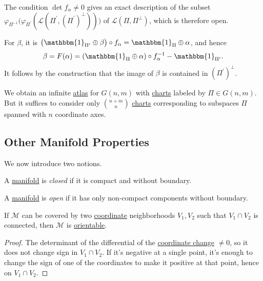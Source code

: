 \begin{note}
	The condition \(\det f_\alpha \neq 0\) gives an exact description of the subset \(\varphi _{\Pi ^{-1} }\big(\varphi _{\Pi ^\prime }(\mathcal{L} (\Pi ^\prime , (\Pi ^\prime )^{\perp} ))\big)\) of \(\mathcal{L} (\Pi , \Pi ^{\perp} )\), which is therefore open.
\end{note}

For \(\beta \), it is \(\big(\mathbbm{1}_{\Pi ^\prime }\oplus \beta \big) \circ f_\alpha = \mathbbm{1}_{\Pi }\oplus \alpha \), and hence
\[
	\beta = F(\alpha ) = (\mathbbm{1}_{\Pi }\oplus \alpha )\circ f_\alpha ^{-1} - \mathbbm{1}_{\Pi ^\prime } .
\]
It follows by the construction that the image of \(\beta \) is contained in \((\Pi ^\prime )^{\perp} \).

\begin{remark}
	We obtain an infinite \hyperref[def:atlas]{atlas} for \(G(n, m)\) with \hyperref[def:coordinate-chart]{charts} labeled by \(\Pi \in G(n, m)\). But it suffices to consider only \(\binom{n+m}{n}\) \hyperref[def:coordinate-chart]{charts} corresponding to subspaces \(\Pi \) spanned with \(n\) coordinate axes.
\end{remark}

\subsection{Other Manifold Properties}
We now introduce two notions.

\begin{definition}\label{def:closed-manifold}
	A \hyperref[def:topological-manifold]{manifold} is \emph{closed} if it is compact and without boundary.
\end{definition}

\begin{definition}\label{def:open-manifold}
	A \hyperref[def:topological-manifold]{manifold} is \emph{open} if it has only non-compact components without boundary.
\end{definition}

\begin{lemma}
	If \(\mathcal{M} \) can be covered by two \hyperref[def:coordinate-chart]{coordinate} neighborhoods \(V_1, V_2\) such that \(V_1 \cap V_2\) is connected, then \(\mathcal{M} \) is \hyperref[def:orientable]{orientable}.
\end{lemma}
\begin{proof}
	The determinant of the differential of the \hyperref[def:coordinate-transition]{coordinate change} \(\neq 0\), so it does not change sign in \(V_1 \cap V_2\). If it's negative at a single point, it's enough to change the sign of one of the coordinates to make it positive at that point, hence on \(V_1 \cap V_2\).
\end{proof}

